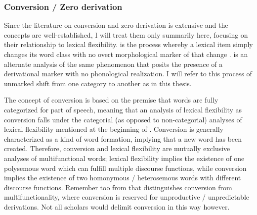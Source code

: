 \subsubsection{Conversion / Zero derivation}
\label{sec:2.3.1.7}

Since the literature on conversion and zero derivation is extensive and the concepts are well-established, I will treat them only summarily here, focusing on their relationship to lexical flexibility.  is the process whereby a lexical item simply changes its word class with no overt morphological marker of that change \parencite[114]{Crystal2008}.  is an alternate analysis of the same phenomenon that posits the presence of a derivational marker with no phonological realization.  I will refer to this process of unmarked shift from one category to another as  in this thesis.

The concept of conversion is based on the premise that words are fully categorized for part of speech, meaning that an analysis of lexical flexibility as conversion falls under the categorial (as opposed to non-categorial) analyses of lexical flexibility mentioned at the beginning of . Conversion is generally characterized as a kind of word formation, implying that a new word has been created. Therefore, conversion and lexical flexibility are mutually exclusive analyses of multifunctional words; lexical flexibility implies the existence of one polysemous word which can fulfill multiple discourse functions, while conversion implies the existence of two homonymous / heterosemous words with different discourse functions. Remember too from  that \textcite{Lier2012} distinguishes conversion from multifunctionality, where conversion is reserved for unproductive / unpredictable derivations. Not all scholars would delimit conversion in this way however.


